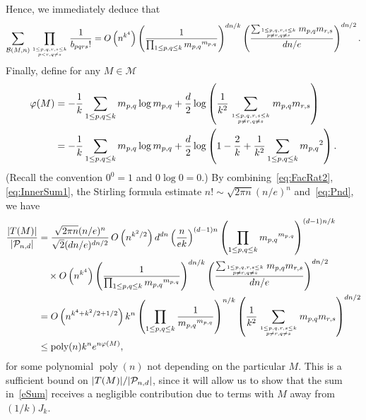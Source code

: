 \documentclass[12pt]{article}
\newcommand{\lab}[1]{\label{#1}}
\def\P{{\cal P}}
\def\Pnd{\P_{n,d}}
\def\be{\begin{equation}}
\def\ee{\end{equation}}
\newcommand{\bel}[1]{\be\lab{#1}}
\DeclareMathOperator{\poly}{poly}
\newcommand{\cB} {\ensuremath{\mathcal B}}
\newcommand{\cM} {\ensuremath{\mathcal M}}
\begin{document}
%
Hence, we immediately deduce that
%
\bel{eq:InnerSum1}
\sum_{\cB(M,n)}
\prod_{1\le p,q,r,s\le k\atop p<r,q\ne s} \frac{1}{b_{pqrs}!} 
=
O\left(n^{k^4}\right) \left(\frac{1}{\prod_{1\le p,q\le k} {m_{p,q}}^{m_{p,q}}}\right)^{dn/k} \left(\frac{\sum_{1\le p,q,r,s\le k\atop p\ne r,q\ne s} m_{p,q}m_{r,s}}{dn/e}\right)^{dn/2}.
\ee
%
Finally, define for any $M\in\cM$
%
\begin{align}
\varphi(M) &= -\frac{1}{k}\sum_{1\le p,q\le k} m_{p,q}\log m_{p,q} + \frac{d}{2}\log\left(\frac{1}{k^2}\sum_{1\le p,q,r,s\le k\atop p\ne r,q\ne s} m_{p,q}m_{r,s}\right)
\notag\\
&= -\frac{1}{k}\sum_{1\le p,q\le k} m_{p,q}\log m_{p,q} + \frac{d}{2}\log\left(1-\frac{2}{k}+\frac{1}{k^2}\sum_{1\le p,q\le k} {m_{p,q}}^2\right).
\label{eq:G}
\end{align}
(Recall the convention $0^0=1$ and $0\log0=0$.)
By combining~\eqref{eq:FacRat2}, \eqref{eq:InnerSum1}, the Stirling formula estimate  
$n!\sim\sqrt{2\pi n}(n/e)^n$ and~\eqref{eq:Pnd}, we have
\begin{align}
\frac{|T(M)| }{|\Pnd|} &= \frac{\sqrt{2\pi n}(n/e)^n}{\sqrt{2}(dn/e)^{dn/2}}\,
O\left(n^{k^2/2}\right) d^{dn} \left(\frac{n}{ek}\right)^{(d-1)n}
\left(\prod_{1\le p,q\le k} {m_{p,q}}^{m_{p,q}}\right)^{(d-1)n/k}
\notag\\
&\quad \times O\left(n^{k^4}\right) \left(\frac{1}{\prod_{1\le p,q\le k} {m_{p,q}}^{m_{p,q}}}\right)^{dn/k} \left(\frac{\sum_{1\le p,q,r,s\le k\atop p\ne r,q\ne s} m_{p,q}m_{r,s}}{dn/e}\right)^{dn/2}
\notag\\
&= O\left(n^{k^4+k^2/2+1/2}\right) k^n
\left(\prod_{1\le p,q\le k}
\frac{1}{{m_{p,q}}^{m_{p,q}}}\right)^{n/k}
\left(\frac{1}{k^2}\sum_{1\le p,q,r,s\le k\atop p\ne r,q\ne s} m_{p,q}m_{r,s}\right)^{dn/2}
\notag\\
&\le \poly(n) k^n e^{n\varphi(M)},
\label{eq:term}
\end{align}
for some polynomial $\poly(n)$ not depending on the particular $M$.
This is a sufficient bound on $|T(M)|/|\Pnd|$, since it will allow us to show that the sum in~\eqref{eSum} receives a negligible contribution due to terms with $M$ away from $(1/k)J_k$.
\end{document}
